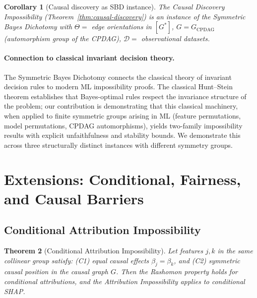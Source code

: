 \documentclass{article}
\newtheorem{theorem}{Theorem}
\newtheorem{corollary}[theorem]{Corollary}
\begin{document}
\begin{corollary}[Causal discovery as SBD instance]
\label{cor:causal-discovery-instance}
The Causal Discovery Impossibility (Theorem~\ref{thm:causal-discovery})
is an instance of the Symmetric Bayes Dichotomy with
$\Theta =$ edge orientations in $[G^*]$,
$G = G_{\text{CPDAG}}$ (automorphism group of the CPDAG),
$\mathcal{D} =$ observational datasets.
\end{corollary}

\paragraph{Connection to classical invariant decision theory.}
\begin{sloppypar}
The Symmetric Bayes Dichotomy connects the classical theory of invariant decision
rules \citep{lehmann2005testing,hunt1946} to modern ML impossibility proofs. The
classical Hunt--Stein theorem establishes that Bayes-optimal rules respect the
invariance structure of the problem; our contribution is demonstrating that this
classical machinery, when applied to finite symmetric groups arising in ML (feature
permutations, model permutations, CPDAG automorphisms), yields two-family
impossibility results with explicit unfaithfulness and stability bounds. We
demonstrate this across three structurally distinct instances with different
symmetry groups.
\end{sloppypar}


\section{Extensions: Conditional, Fairness, and Causal Barriers}
\label{sec:extensions}

\subsection{Conditional Attribution Impossibility}
\label{sec:conditional}

\begin{theorem}[Conditional Attribution Impossibility]
\label{thm:conditional-impossibility}
Let features $j, k$ in the same collinear group satisfy: (C1) equal causal effects $\beta_j = \beta_k$, and (C2) symmetric causal position in the causal graph $G$. Then the Rashomon property holds for conditional attributions, and the Attribution Impossibility applies to conditional SHAP.
\end{theorem}
\end{document}
